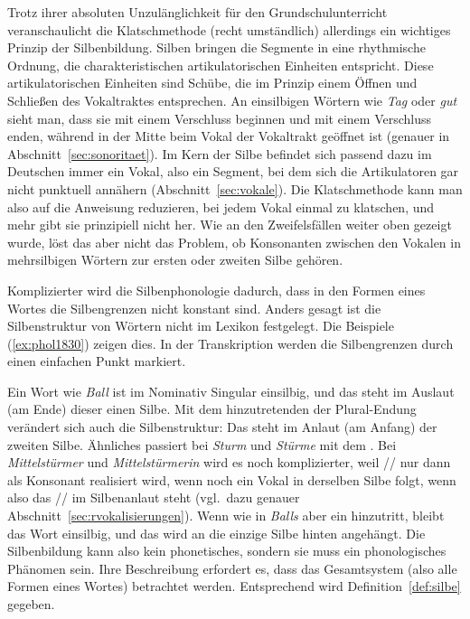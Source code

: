 Trotz ihrer absoluten Unzulänglichkeit für den Grundschulunterricht veranschaulicht die Klatschmethode (recht umständlich) allerdings ein wichtiges Prinzip der Silbenbildung.
Silben bringen die Segmente in eine rhythmische Ordnung, die charakteristischen artikulatorischen Einheiten entspricht.
Diese artikulatorischen Einheiten sind Schübe, die im Prinzip einem Öffnen und Schließen des Vokaltraktes entsprechen.
An einsilbigen Wörtern wie \textit{Tag} \textipa{[ta:k]} oder \textit{gut} \textipa{[gU:t]} sieht man, dass sie mit einem Verschluss beginnen und mit einem Verschluss enden, während in der Mitte beim Vokal der Vokaltrakt geöffnet ist (genauer in Abschnitt~\ref{sec:sonoritaet}).
Im Kern der Silbe befindet sich passend dazu im Deutschen immer ein Vokal, also ein Segment, bei dem sich die Artikulatoren gar nicht punktuell annähern (Abschnitt~\ref{sec:vokale}).
Die Klatschmethode kann man also auf die Anweisung reduzieren, bei jedem Vokal einmal zu klatschen, und mehr gibt sie prinzipiell nicht her.
Wie an den Zweifelsfällen weiter oben gezeigt wurde, löst das aber nicht das Problem, ob Konsonanten zwischen den Vokalen in mehrsilbigen Wörtern zur ersten oder zweiten Silbe gehören.

Komplizierter wird die Silbenphonologie dadurch, dass in den Formen eines Wortes die Silbengrenzen nicht konstant sind.
Anders gesagt ist die Silbenstruktur von Wörtern nicht im Lexikon festgelegt.
Die Beispiele (\ref{ex:phol1830}) zeigen dies.
In der Transkription werden die Silbengrenzen durch einen einfachen Punkt markiert.

\begin{exe}
  \ex\label{ex:phol1830}
  \begin{xlist}
  \end{xlist}
\end{exe}

Ein Wort wie \textit{Ball} ist im Nominativ Singular einsilbig, und das \textipa{[l]} steht im Auslaut (am Ende) dieser einen Silbe.
Mit dem hinzutretenden \textipa{[@]} der Plural-Endung verändert sich auch die Silbenstruktur:
Das \textipa{[l]} steht im Anlaut (am Anfang) der zweiten Silbe.
Ähnliches passiert bei \textit{Sturm} und \textit{Stürme} mit dem \textipa{[m]}.
Bei \textit{Mittelstürmer} \textipa{[mI.t@l.St\t{Y@}.m5]} und \textit{Mittelstürmerin} \textipa{[mI.t@l.St\t{Y@}.m@.KIn]} wird es noch komplizierter, weil // nur dann als Konsonant \textipa{[K]} realisiert wird, wenn noch ein Vokal in derselben Silbe folgt, wenn also das // im Silbenanlaut steht (vgl.\ dazu genauer Abschnitt~\ref{sec:rvokalisierungen}).
Wenn wie in \textit{Balls} aber ein \textipa{[s]} hinzutritt, bleibt das Wort einsilbig, und das \textipa{[s]} wird an die einzige Silbe hinten angehängt.
Die Silbenbildung kann also kein phonetisches, sondern sie muss ein phonologisches Phänomen sein.
Ihre Beschreibung erfordert es, dass das Gesamtsystem (also \zB alle Formen eines Wortes) betrachtet werden.
Entsprechend wird Definition~\ref{def:silbe} gegeben.

